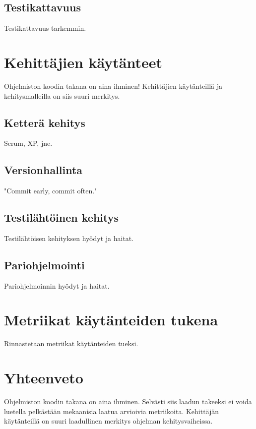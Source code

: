 \documentclass[finnish]{../tktltiki2}
\theoremstyle{definition}
\theoremstyle{remark}
\begin{document}
\subsection{Testikattavuus}

Testikattavuus tarkemmin.

\section{Kehittäjien käytänteet}

Ohjelmiston koodin takana on aina ihminen! Kehittäjien käytänteillä ja kehitysmalleilla on siis suuri merkitys.

\subsection{Ketterä kehitys}

Scrum, XP, jne.

\subsection{Versionhallinta}

"Commit early, commit often."

\subsection{Testilähtöinen kehitys}

Testilähtöisen kehityksen hyödyt ja haitat.

\subsection{Pariohjelmointi}

Pariohjelmoinnin hyödyt ja haitat.

\section{Metriikat käytänteiden tukena}

Rinnastetaan metriikat käytänteiden tueksi.

\section{Yhteenveto}

Ohjelmiston koodin takana on aina ihminen.  Selvästi siis laadun takeeksi ei voida luetella pelkästään mekaanisia laatua 
arvioivia metriikoita. Kehittäjän käytänteillä on suuri laadullinen merkitys ohjelman kehitysvaiheissa.




\end{document}
